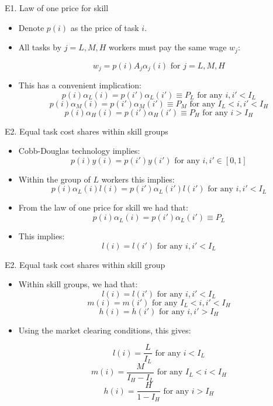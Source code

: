 \documentclass[notes=show]{beamer}
\begin{document}
\begin{frame}{E1. Law of one price for skill}
\begin{itemize}
\item Denote $p(i)$ as the price of task $i$. \medskip
\item All tasks by $j=L,M,H$ workers must pay the same wage $w_{j}$:
\begin{tcolorbox}
\[
w_{j} = p(i)A_{j} \alpha_{j}(i) \text{ for } j = L,M,H
\]
\end{tcolorbox}
\item This has a convenient implication:
\[
p(i) \alpha_{L}(i) = p(i') \alpha_{L}(i') \equiv P_{L} \text{ for any } i,i' < I_{L} \tag{14} \label{eq14}
\]
\[
p(i) \alpha_{M}(i) = p(i') \alpha_{M}(i') \equiv P_{M} \text{ for any } I_{L} < i,i' < I_{H} \tag{15} \label{eq15}
\]
\[
p(i) \alpha_{H}(i) = p(i') \alpha_{H}(i') \equiv P_{H} \text{ for any } i > I_{H} \tag{16} \label{eq16}
\]
\end{itemize}
\end{frame}

\begin{frame}{E2. Equal task cost shares within skill groups}
\begin{itemize}
\item Cobb-Douglas technology implies:
\[
p(i)y(i) = p(i')y(i') \text{ for any } i,i' \in [0,1] \tag{17} \label{eq17}
\]
\item Within the group of $L$ workers this implies:
\[
p(i) \alpha_{L}(i) l(i) = p(i') \alpha_{L}(i') l(i') \text{ for any } i,i' < I_{L}
\]
\item From the law of one price for skill we had that:
\[
p(i) \alpha_{L}(i) = p(i') \alpha_{L}(i') \equiv P_{L}
\]
\item This implies:
\[
l(i) = l(i') \text{ for any } i,i' < I_{L}
\]
\end{itemize}
\end{frame}

\begin{frame}{E2. Equal task cost shares within skill group}
\begin{itemize}
\item Within skill groups, we had that:
\[
l(i) = l(i') \text{ for any } i,i' < I_{L}
\]
\[
m(i) = m(i') \text{ for any } I_{L} < i,i' < I_{H}
\]
\[
h(i) = h(i') \text{ for any } i,i' > I_{H}
\]
\item Using the market clearing conditions, this gives:
\begin{tcolorbox}
\[
l(i) = \frac{L}{I_{L}} \text{ for any } i < I_{L} \tag{18} \label{eq18}
\]
\[
m(i) = \frac{M}{I_{H} - I_{L}} \text{ for any } I_{L} < i < I_{H} \tag{19} \label{eq19}
\]
\[
h(i) = \frac{H}{1 - I_{H}} \text{ for any } i > I_{H} \tag{20} \label{eq20}
\]
\end{tcolorbox}
\end{itemize}
\end{frame}
\end{document}
